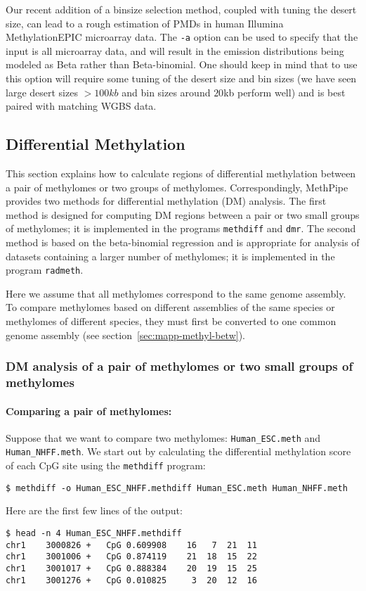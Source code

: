 \documentclass[10pt]{article}
\newcommand{\prog}[1]{\texttt{#1}}
\newcommand{\op}[1]{\texttt{#1}}
\begin{document}
Our recent addition of a binsize selection method, coupled with tuning the desert
size, can lead to a rough estimation of PMDs in human Illumina MethylationEPIC
microarray data. The \op{-a} option can be used to specify that the input is all
microarray data, and will
result in the emission distributions being modeled as Beta rather than
Beta-binomial. One should keep in mind that to use this option will require
some tuning of the desert size and bin sizes (we have seen large desert sizes
$>100kb$ and bin sizes around $20$kb perform well) and is best paired with
matching WGBS data.

\subsection{Differential Methylation}
\label{sec:differential_methylation}

This section explains how to calculate regions of differential methylation 
between a pair of methylomes or two groups of methylomes. Correspondingly, 
MethPipe provides two methods for differential methylation (DM) analysis. 
The first method is designed for computing DM regions between a pair or two 
small groups of methylomes; it is implemented in the programs \prog{methdiff} 
and \prog{dmr}. The second method is based on the beta-binomial 
regression and is appropriate for analysis of datasets containing a larger 
number of methylomes; it is implemented in the program \prog{radmeth}.

Here we assume that all methylomes correspond to the same genome 
assembly. To compare methylomes based on different assemblies of the 
same species or methylomes of different species, they must first be 
converted to one common genome assembly (see 
section~\ref{sec:mapp-methyl-betw}).

\subsubsection{DM analysis of a pair of methylomes or two small groups of 
			   methylomes}

\paragraph{Comparing a pair of methylomes:} 
Suppose that we want to compare two methylomes: {\tt Human\_ESC.meth} and 
{\tt Human\_NHFF.meth}. We start out by calculating the differential 
methylation score of each CpG site using the \prog{methdiff} program:
{\small{%
\begin{verbatim}
$ methdiff -o Human_ESC_NHFF.methdiff Human_ESC.meth Human_NHFF.meth
\end{verbatim}%
}}
Here are the first few lines of the output:
{\small{%
\begin{verbatim}
$ head -n 4 Human_ESC_NHFF.methdiff
chr1	3000826	+	CpG	0.609908	16	 7	21	11
chr1	3001006	+	CpG	0.874119	21	18	15	22
chr1	3001017	+	CpG	0.888384	20	19	15	25
chr1	3001276	+	CpG	0.010825	 3	20	12	16
\end{verbatim}%
}}
\end{document}

